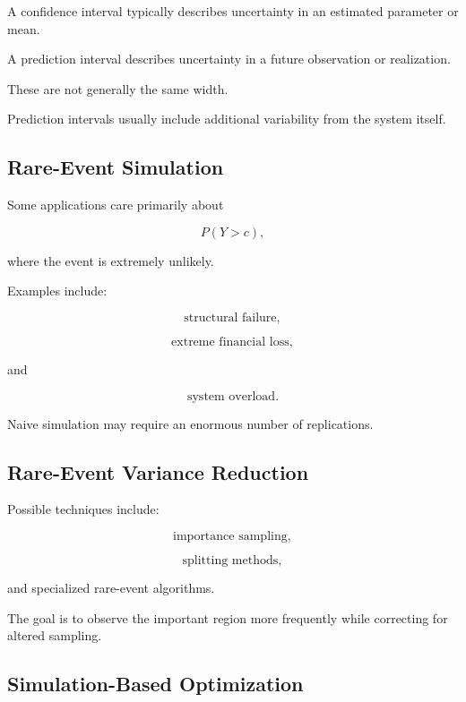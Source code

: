 A confidence interval typically describes uncertainty in an estimated
parameter or mean.

A prediction interval describes uncertainty in a future observation or
realization.

These are not generally the same width.

Prediction intervals usually include additional variability from the
system itself.

\subsection{Rare-Event Simulation}
\label{subsec:simulation-rare-events}

Some applications care primarily about

\[
\boxed{
P(Y>c),
}
\]

where the event is extremely unlikely.

Examples include:

\[
\boxed{
\text{structural failure},
}
\]

\[
\boxed{
\text{extreme financial loss},
}
\]

and

\[
\boxed{
\text{system overload}.
}
\]

Naive simulation may require an enormous number of replications.

\subsection{Rare-Event Variance Reduction}
\label{subsec:simulation-rare-event-variance-reduction}

Possible techniques include:

\[
\boxed{
\text{importance sampling},
}
\]

\[
\boxed{
\text{splitting methods},
}
\]

and specialized rare-event algorithms.

The goal is to observe the important region more frequently while
correcting for altered sampling.

\subsection{Simulation-Based Optimization}
\label{subsec:simulation-based-optimization}

